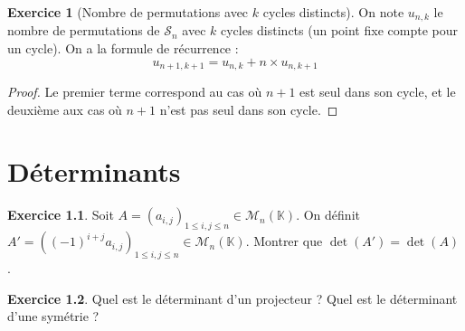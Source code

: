 \documentclass[french]{book}
\newcommand{\K}{\mathbb{K}}
\theoremstyle{definition}
\newtheorem{ex}{Exercice}[chapter]
\theoremstyle{theorem}
\theoremstyle{remark}
\begin{document}
\begin{ex}[Nombre de permutations avec $k$ cycles distincts] On note $u_{n,k}$ le nombre de permutations de $\mathcal{S}_n$ avec $k$ cycles distincts (un point fixe compte pour un cycle). On a la formule de récurrence : $$u_{n+1,k+1}=u_{n,k}+n\times u_{n,k+1}$$
\end{ex}

\begin{proof}
	Le premier terme correspond au cas où $n+1$ est seul dans son cycle, et le deuxième aux cas où $n+1$ n'est pas seul dans son cycle.
\end{proof}



\chapter{Déterminants}

\begin{ex}
	Soit $A=(a_{i,j})_{1\leqslant i,j\leqslant n}\in\mathcal{M}_n(\K)$. On définit $A'=((-1)^{i+j}a_{i,j})_{1\leqslant i,j\leqslant n}\in\mathcal{M}_n(\K)$. Montrer que $\det(A')=\det(A)$.
\end{ex}

\begin{ex}
	Quel est le déterminant d'un projecteur ? Quel est le déterminant d'une symétrie ?
\end{ex}
\end{document}
